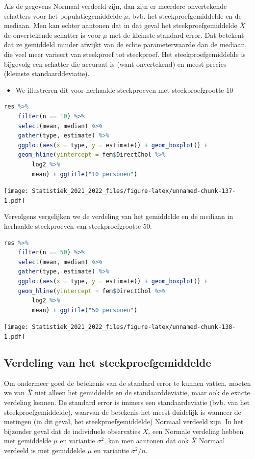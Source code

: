 \documentclass[
  12pt,dutch,coursenotes]{book}
\providecommand{\tightlist}{%
  \setlength{\itemsep}{0pt}\setlength{\parskip}{0pt}}
\theoremstyle{definition}
\theoremstyle{definition}
\theoremstyle{definition}
\theoremstyle{definition}
\theoremstyle{remark}
\begin{document}
Als de gegevens Normaal verdeeld zijn, dan zijn er meerdere onvertekende
schatters voor het populatiegemiddelde \(\mu\), bvb. het steekproefgemiddelde en
de mediaan. Men kan echter aantonen dat in dat geval het
steekproefgemiddelde \(\bar{X}\) de onvertekende schatter is voor \(\mu\) met de
kleinste standard error. Dat betekent dat ze gemiddeld minder afwijkt van
de echte parameterwaarde dan de mediaan, die veel meer
varieert van steekproef tot steekproef. Het steekproefgemiddelde is
bijgevolg een schatter die accuraat is (want onvertekend) en meest precies
(kleinste standaarddeviatie).

\begin{itemize}
\tightlist
\item
  We illustreren dit voor herhaalde steekproeven met steekproefgrootte 10
\end{itemize}

\begin{lstlisting}[language=R]
res %>%
    filter(n == 10) %>%
    select(mean, median) %>%
    gather(type, estimate) %>%
    ggplot(aes(x = type, y = estimate)) + geom_boxplot() +
    geom_hline(yintercept = fem$DirectChol %>%
        log2 %>%
        mean) + ggtitle("10 personen")
\end{lstlisting}

\texttt{[image: Statistiek\_2021\_2022\_files/figure-latex/unnamed-chunk-137-1.pdf]}

Vervolgens vergelijken we de verdeling van het gemiddelde en de mediaan in herhaalde steekproeven van steekproefgrootte 50.

\begin{lstlisting}[language=R]
res %>%
    filter(n == 50) %>%
    select(mean, median) %>%
    gather(type, estimate) %>%
    ggplot(aes(x = type, y = estimate)) + geom_boxplot() +
    geom_hline(yintercept = fem$DirectChol %>%
        log2 %>%
        mean) + ggtitle("50 personen")
\end{lstlisting}

\texttt{[image: Statistiek\_2021\_2022\_files/figure-latex/unnamed-chunk-138-1.pdf]}

\hypertarget{subsec:verdelingXbar}{%
\subsection{Verdeling van het steekproefgemiddelde}\label{subsec:verdelingXbar}}

Om ondermeer goed de betekenis van de standard error te kunnen vatten, moeten we van \(\bar X\) niet alleen het gemiddelde en de standaarddeviatie, maar ook de exacte verdeling kennen. De standard error is immers een standaardeviatie (bvb. van het steekproefgemiddelde), waarvan de betekenis het meest duidelijk is wanneer de metingen (in dit geval, het steekproefgemiddelde) Normaal verdeeld zijn.
In het bijzonder geval dat de
individuele observaties \(X_i\) een Normale verdeling hebben met gemiddelde \(\mu\) en variantie \(\sigma^2\), kan men aantonen dat ook \(\bar X\) Normaal verdeeld is met gemiddelde \(\mu\) en variantie \(\sigma^2/n.\)
\end{document}
